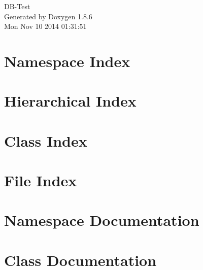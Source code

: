 \documentclass[twoside]{book}
\newcommand{\clearemptydoublepage}{%
  \newpage{\pagestyle{empty}\cleardoublepage}%
}
\begin{document}
\hypersetup{pageanchor=false}
\begin{titlepage}
\vspace*{7cm}
\begin{center}%
{\Large D\-B-\/\-Test }\\
\vspace*{1cm}
{\large Generated by Doxygen 1.8.6}\\
\vspace*{0.5cm}
{\small Mon Nov 10 2014 01:31:51}\\
\end{center}
\end{titlepage}
\clearemptydoublepage
\tableofcontents
\clearemptydoublepage
{}
\hypersetup{pageanchor=true}

\chapter{Namespace Index}

\chapter{Hierarchical Index}

\chapter{Class Index}

\chapter{File Index}

\chapter{Namespace Documentation}


\chapter{Class Documentation}















\end{document}
